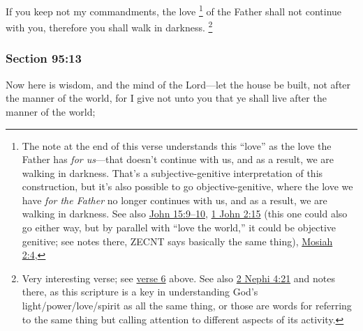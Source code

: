 		If you keep not my commandments, the love%
			\footnote{%
				The note at the end of this verse understands this ``love'' as the love the Father has \textit{for us}---that doesn't continue with us, and as a result, we are walking in darkness. That's a subjective-genitive interpretation of this construction, but it's also possible to go objective-genitive, where the love we have \textit{for the Father} no longer continues with us, and as a result, we are walking in darkness. See also \hyperref[JOHN-15-9]{John 15:9--10}, \hyperref[1JOHN-2-15]{1 John 2:15} (this one could also go either way, but by parallel with ``love the world,'' it could be objective genitive; see notes there, ZECNT says basically the same thing), \hyperref[MOSIAH-2-4]{Mosiah 2:4}, 
				}
		of the Father shall not continue with you, therefore you shall walk in darkness.%
			\footnote{%
				Very interesting verse; see \hyperref[DC95-6]{verse 6} above. See also \hyperref[2NEPHI-4-21]{2 Nephi 4:21} and notes there, as this scripture is a key in understanding God's light/power/love/spirit as all the same thing, or those are words for referring to the same thing but calling attention to different aspects of its activity.
				}


	\subsubsection{Section 95:13} %
		\label{DC95-13}

		Now here is wisdom, and the mind of the Lord---let the house be built, not after the manner of the world, for I give not unto you that ye shall live after the manner of the world;


